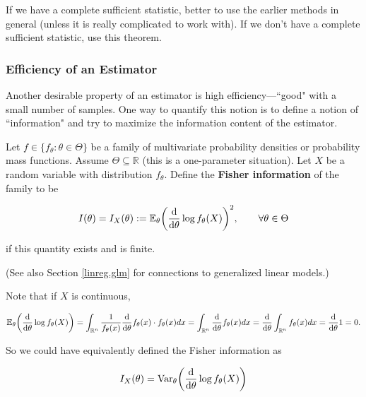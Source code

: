 \begin{remark} If we have a complete sufficient statistic, better to use the earlier methods in general (unless it is really complicated to work with). If we don't have a complete sufficient statistic, use this theorem.

\end{remark}

\subsubsection{Efficiency of an Estimator}\label{mathstats.eff.est} Another desirable property of an estimator is high efficiency---``good" with a small number of samples. One way to quantify this notion is to define a notion of ``information" and try to maximize the information content of the estimator.

\begin{definition}\label{mathstats.def.fish.inf} Let \(f \in \{f_\theta: \theta \in \Theta \}\) be a family of multivariate probability densities or probability mass functions. Assume \(\Theta \subseteq \mathbb{R}\) (this is a one-parameter situation). Let \(X\) be a random variable with distribution \(f_\theta\). Define the \textbf{Fisher information} of the family to be

\[
I(\theta) = I_X(\theta) := \E_\theta \bigg( \deriv{}{\theta} \log f_\theta (X) \bigg)^2, \qquad \forall \theta \in \Theta
\]

if this quantity exists and is finite.

\end{definition}

(See also Section \ref{linreg.glm} for connections to generalized linear models.)

\begin{remark} Note that if \(X\) is continuous, 

\[
\E_\theta \bigg( \deriv{}{\theta} \log f_\theta (X) \bigg) = \int_{\mathbb{R}^n} \frac{1}{f_\theta(x)} \deriv{}{\theta} f_\theta(x) \cdot f_\theta(x) dx = \int_{\mathbb{R}^n} \deriv{}{\theta} f_\theta(x) dx = \deriv{}{\theta} \int_{\mathbb{R}^n} f_\theta(x) dx = \deriv{}{\theta} 1   = 0.
\]

So we could have equivalently defined the Fisher information as 

\[
I_X(\theta) = \Var_\theta \bigg( \deriv{}{\theta} \log f_\theta (X) \bigg)
\]

\end{remark}

